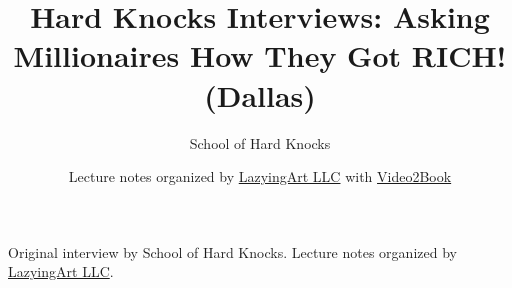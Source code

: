 \documentclass[11pt,oneside]{book}
\begin{document}
\frontmatter
\title{Hard Knocks Interviews: Asking Millionaires How They Got RICH! (Dallas)}
\author{School of Hard Knocks}
\date{Lecture notes organized by \href{https://lazying.art}{LazyingArt LLC} with \href{https://github.com/lachlanchen/Video2Book}{Video2Book}}
\maketitle
\begin{center}
\small Original interview by School of Hard Knocks. Lecture notes organized by \href{https://lazying.art}{LazyingArt LLC}.
\end{center}
\clearpage
\mainmatter

\end{document}

